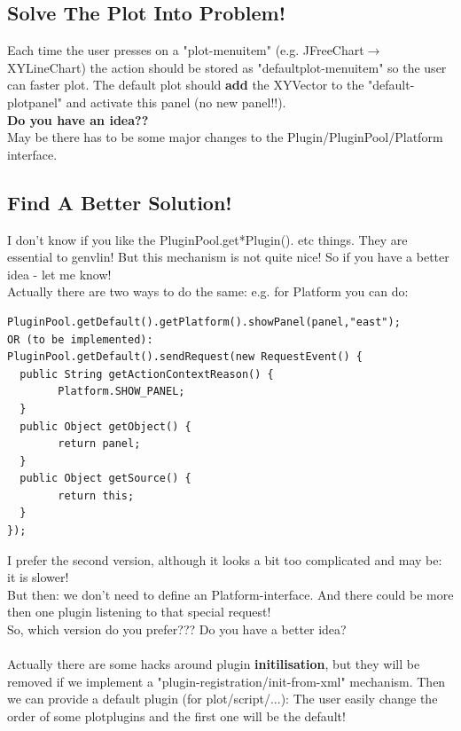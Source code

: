 \documentclass[12pt]{article}
\begin{document}
\subsection{Solve The Plot Into Problem!}
Each time the user presses on a "plot-menuitem" (e.g. JFreeChart$\rightarrow$XYLineChart) the action should be stored as "defaultplot-menuitem" so the user can faster plot. The default plot should {\bf add} the XYVector
to the "default-plotpanel" and activate this panel (no new panel!!).\\
{\bf Do you have an idea??}\\
May be there has to be some major changes to the Plugin/PluginPool/Platform interface.
\subsection{Find A Better Solution!}
\label{pluginOQ}
I don't know if you like the PluginPool.get*Plugin(). etc things. They are essential to genvlin!
But this mechanism is not quite nice! So if you have a better idea - let me know!\\
Actually there are two ways to do the same: e.g. for Platform you can do:\\
\begin{verbatim}
PluginPool.getDefault().getPlatform().showPanel(panel,"east");
OR (to be implemented):
PluginPool.getDefault().sendRequest(new RequestEvent() {
  public String getActionContextReason() {
        Platform.SHOW_PANEL;
  }
  public Object getObject() {
        return panel;
  }
  public Object getSource() {
        return this;
  }
});
\end{verbatim}
I prefer the second version, although it looks a bit too complicated and may be: it is slower!\\
But then: we don't need to define an Platform-interface. And there could be more then one plugin listening to that special request!\\
So, which version do you prefer??? Do you have a better idea?\\ \\
Actually there are some hacks around plugin {\bf initilisation}, but they will be removed if we implement a "plugin-registration/init-from-xml" mechanism. Then we can provide a default plugin (for plot/script/...): The user easily change the order of some plotplugins and the first one will be the default!
\end{document}
